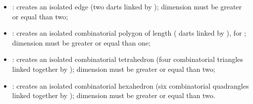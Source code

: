 \begin{itemize}
\item {}: creates an isolated edge (two darts
  linked by \betadeux{}); dimension must be greater or equal than two;
\item {}: creates an
  isolated combinatorial polygon of length  ( darts
  linked by \betaun{}), for ; dimension must be greater
  or equal than one;
\item {}: creates an
  isolated combinatorial tetrahedron (four combinatorial triangles
  linked together by \betadeux{}); dimension must be greater or equal
  than two;
\item {}: creates an
  isolated combinatorial hexahedron (six combinatorial quadrangles
  linked together by \betadeux{}); dimension must be greater or equal
  than two.
\end{itemize}


